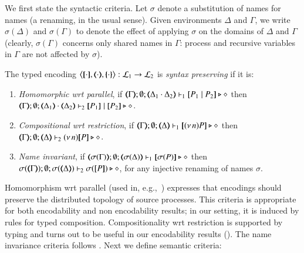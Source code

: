 We first state the 
syntactic criteria. 
Let $\sigma$ denote a substitution of names for names (a renaming, in the usual sense). Given environments $\Delta$ and $\Gamma$,
we write $\sigma(\Delta)$ and $\sigma(\Gamma)$ to denote the effect of applying $\sigma$ on the 
domains of $\Delta$ and $\Gamma$
(clearly, $\sigma(\Gamma)$ concerns only shared names in $\Gamma$: process and recursive variables in $\Gamma$ are not affected by $\sigma$). 

\smallskip 

\begin{definition}\rm
	\label{def:sep}
	The typed encoding 
	$\enco{\map{\cdot}, \mapt{\cdot}, \mapa{\cdot}}: \tyl{L}_1 \to \tyl{L}_2$ is \emph{syntax preserving}
	if it is:
	
	\begin{enumerate}[1.]
		\item	\emph{Homomorphic wrt parallel},   if 
		$\mapt{\Gamma}; \emptyset; \mapt{\Delta_1 \cat \Delta_2} \proves_1 \map{P_1 \Par P_2} \hastype \Proc$
		then 
		$\mapt{\Gamma}; \emptyset; \mapt{\Delta_1} \cat \mapt{\Delta_2} \proves_2 \map{P_1} \Par \map{P_2} \hastype \Proc$.

		\item	\emph{Compositional wrt restriction},  if 
		$\mapt{\Gamma}; \emptyset; \mapt{\Delta} \proves_1 \map{\news{n}P} \hastype \Proc$
		then 
		$\mapt{\Gamma}; \emptyset; \mapt{\Delta} \proves_2 \news{n}\map{P} \hastype \Proc$.
		
		\item \emph{Name invariant},   if
		$\mapt{\sigma(\Gamma)}; \emptyset; \mapt{\sigma(\Delta)} \proves_1 \map{\sigma(P)} \hastype \Proc$
		then \\
		$\sigma(\mapt{\Gamma}); \emptyset; \sigma(\mapt{\Delta}) \proves_2 \sigma(\map{P}) \hastype \Proc$, 
		for any injective renaming  of names $\sigma$.
	\end{enumerate}
\end{definition}

\smallskip 

\noi Homomorphism wrt parallel (used in, e.g.,~\cite{Palamidessi03,DBLP:conf/lics/PalamidessiSVV06})
expresses that encodings should preserve the distributed topology of source processes. This criteria 
 is appropriate for both encodability and non encodability results; in our setting, it is
induced by rules for typed composition.
Compositionality wrt restriction 
is supported by typing and turns out to be 
useful in our encodability results ().
The name invariance criteria follows \cite{DBLP:journals/iandc/Gorla10,DBLP:conf/icalp/LanesePSS10}. 
Next we define semantic criteria: %

